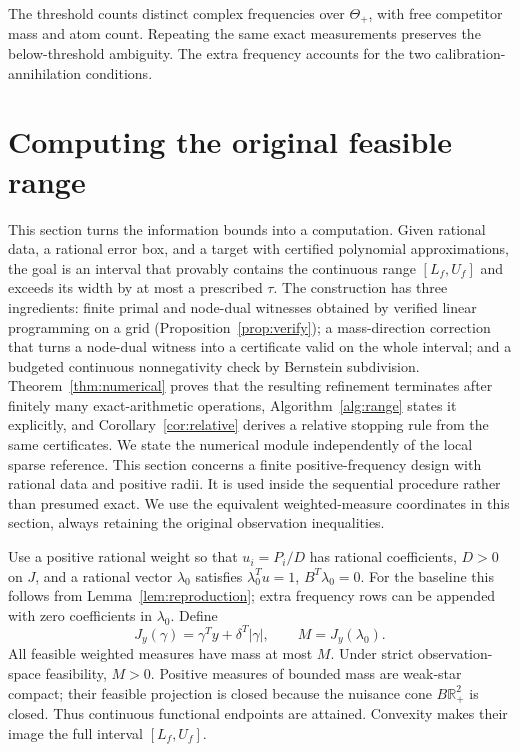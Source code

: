 \documentclass[10pt]{amsart}
\theoremstyle{definition}
\theoremstyle{remark}
\theoremstyle{plain}
\newcommand{\R}{\mathbb R}
\newcommand{\ThetaAll}{\Theta_+}
\begin{document}
The threshold counts distinct complex frequencies over $\ThetaAll$, with free competitor mass and atom count. Repeating the same exact measurements preserves the below-threshold ambiguity. The extra frequency accounts for the two calibration-annihilation conditions.


\section{Computing the original feasible range}\label{sec:cert}
This section turns the information bounds into a computation. Given rational data, a rational error box, and a target with certified polynomial approximations, the goal is an interval that provably contains the continuous range $[L_f,U_f]$ and exceeds its width by at most a prescribed $\tau$. The construction has three ingredients: finite primal and node-dual witnesses obtained by verified linear programming on a grid (Proposition~\ref{prop:verify}); a mass-direction correction that turns a node-dual witness into a certificate valid on the whole interval; and a budgeted continuous nonnegativity check by Bernstein subdivision. Theorem~\ref{thm:numerical} proves that the resulting refinement terminates after finitely many exact-arithmetic operations, Algorithm~\ref{alg:range} states it explicitly, and Corollary~\ref{cor:relative} derives a relative stopping rule from the same certificates. We state the numerical module independently of the local sparse reference. This section concerns a finite positive-frequency design with rational data and positive radii. It is used inside the sequential procedure rather than presumed exact. We use the equivalent weighted-measure coordinates in this section, always retaining the original observation inequalities.

Use a positive rational weight so that $u_i=P_i/D$ has rational coefficients, $D>0$ on $J$, and a rational vector $\lambda_0$ satisfies $\lambda_0^Tu=1$, $B^T\lambda_0=0$. For the baseline this follows from Lemma~\ref{lem:reproduction}; extra frequency rows can be appended with zero coefficients in $\lambda_0$. Define
\[
 J_y(\gamma)=\gamma^Ty+\delta^T|\gamma|,\qquad M=J_y(\lambda_0).
\]
All feasible weighted measures have mass at most $M$. Under strict observation-space feasibility, $M>0$. Positive measures of bounded mass are weak-star compact; their feasible projection is closed because the nuisance cone $B\R_+^2$ is closed. Thus continuous functional endpoints are attained. Convexity makes their image the full interval $[L_f,U_f]$.
\end{document}

